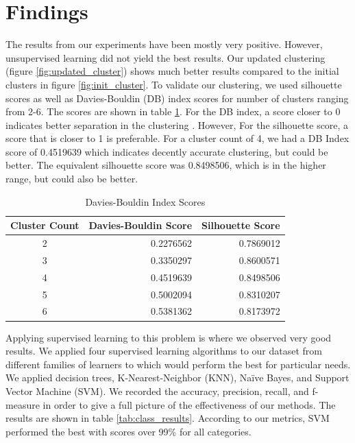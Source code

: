 \documentclass[letterpaper, 10 pt, conference]{ieeeconf}  %
\begin{document}
\textbf{}


\section{Findings}
The results from our experiments have been mostly very positive. However, unsupervised learning did not yield the best results. Our updated clustering (figure \ref{fig:updated_cluster}) shows much better results compared to the initial clusters in figure \ref{fig:init_cluster}. To validate our clustering, we used silhouette scores as well as Davies-Bouldin (DB) index scores for number of clusters ranging from 2-6. The scores are shown in table \ref{tab:cluster_scores}. For the DB index, a score closer to 0 indicates better separation in the clustering \cite{deycheck_dey_2019}. However, For the silhouette score, a score that is closer to 1 is preferable. For a cluster count of 4, we had a DB Index score of 0.4519639 which indicates decently accurate clustering, but could be better. The equivalent silhouette score was 0.8498506, which is in the higher range, but could also be better. 

\begin{table}[htb]
    \centering
    \begin{tabular}{|c|r|r|}
    \hline
        \textbf{Cluster Count} & \multicolumn{1}{c|}{\textbf{Davies-Bouldin Score}} & \multicolumn{1}{c|}{\textbf{Silhouette Score}} \\
        \hline
        2 & 0.2276562 & 0.7869012 \\
        \hline
        3 & 0.3350297 & 0.8600571 \\
        \hline
        4 & 0.4519639 & 0.8498506 \\
        \hline
        5 & 0.5002094 & 0.8310207 \\
        \hline
        6 & 0.5381362 & 0.8173972 \\
        \hline
    \end{tabular}
    \caption{Davies-Bouldin Index Scores}
    \label{tab:cluster_scores}
\end{table}

Applying supervised learning to this problem is where we observed very good results. We applied four supervised learning algorithms to our dataset from different families of learners to which would perform the best for particular needs. We applied decision trees, K-Nearest-Neighbor (KNN), Na\"{i}ve Bayes, and Support Vector Machine (SVM). We recorded the accuracy, precision, recall, and f-measure in order to give a full picture of the effectiveness of our methods. The results are shown in table \ref{tab:class_results}. According to our metrics, SVM performed the best with scores over 99\% for all categories.
\end{document}
